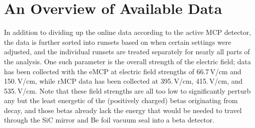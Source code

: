 \section{An Overview of Available Data}
\label{sec:data_overview}

  

In addition to dividing up the online data according to the active \ac{MCP} detector, the data is further sorted into runsets based on when certain settings were adjusted, and the individual runsets are treated separately for nearly all parts of the analysis.  One such parameter is the overall strength of the electric field;  data
has been collected with the eMCP at electric field strengths of 66.7\,V/cm  and 150.\,V/cm, while rMCP data has been collected at 395.\,V/cm, 415.\,V/cm, and 535.\,V/cm.  Note that these field strengths are all too low to significantly perturb any but the least energetic of the (positively charged) betas originating from decay, and those betas already lack the energy that would be needed to travel through the SiC mirror and Be foil vacuum seal into a beta detector. 








